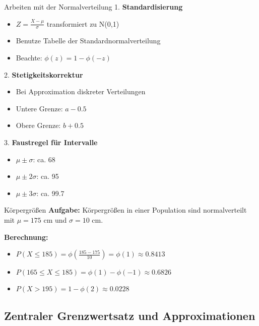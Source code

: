 \begin{KR}{Arbeiten mit der Normalverteilung}
1. \textbf{Standardisierung}
   \begin{itemize}
   \item $Z = \frac{X-\mu}{\sigma}$ transformiert zu N(0,1)
   \item Benutze Tabelle der Standardnormalverteilung
   \item Beachte: $\phi(z) = 1 - \phi(-z)$
   \end{itemize}

2. \textbf{Stetigkeitskorrektur}
   \begin{itemize}
   \item Bei Approximation diskreter Verteilungen
   \item Untere Grenze: $a - 0.5$
   \item Obere Grenze: $b + 0.5$
   \end{itemize}

3. \textbf{Faustregel für Intervalle}
   \begin{itemize}
   \item $\mu \pm \sigma$: ca. 68%
   \item $\mu \pm 2\sigma$: ca. 95%
   \item $\mu \pm 3\sigma$: ca. 99.7%
   \end{itemize}
\end{KR}

\begin{example}{Körpergrößen}
\textbf{Aufgabe:} Körpergrößen in einer Population sind normalverteilt mit $\mu = 175$ cm und $\sigma = 10$ cm.

\textbf{Berechnung:}
\begin{itemize}
\item $P(X \leq 185) = \phi(\frac{185-175}{10}) = \phi(1) \approx 0.8413$
\item $P(165 \leq X \leq 185) = \phi(1) - \phi(-1) \approx 0.6826$
\item $P(X > 195) = 1 - \phi(2) \approx 0.0228$
\end{itemize}
\end{example}

\subsection{Zentraler Grenzwertsatz und Approximationen}

